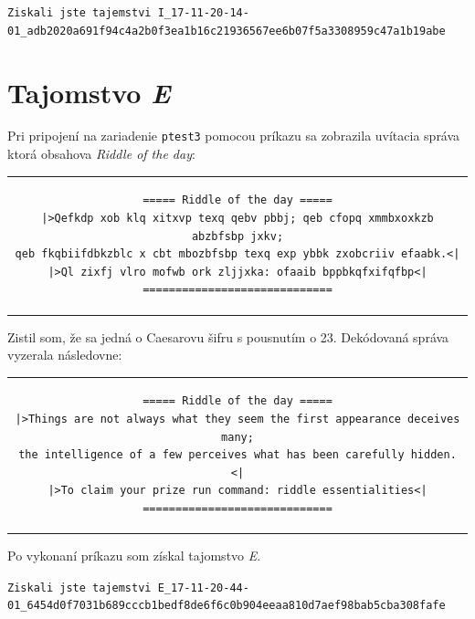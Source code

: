 \documentclass[11pt,a4paper]{article}
\begin{document}
\begin{center}
\small{\texttt{Ziskali jste tajemstvi I\_17-11-20-14-01\_adb2020a691f94c4a2b0f3ea1b16c21936567ee6b07f5a3308959c47a1b19abe}}
\end{center}

\section{Tajomstvo \textit{E}}\label{sec:E}

Pri pripojení na zariadenie \texttt{ptest3} pomocou príkazu  sa zobrazila uvítacia správa ktorá obsahova \textit{Riddle of the day}:

\begin{center}
\begin{tabular}{c}
\begin{lstlisting}[basicstyle=\footnotesize]
===== Riddle of the day =====
|>Qefkdp xob klq xitxvp texq qebv pbbj; qeb cfopq xmmbxoxkzb abzbfsbp jxkv;
qeb fkqbiifdbkzblc x cbt mbozbfsbp texq exp ybbk zxobcriiv efaabk.<|
|>Ql zixfj vlro mofwb ork zljjxka: ofaaib bppbkqfxifqfbp<|
=============================
\end{lstlisting}
\end{tabular}
\end{center}

Zistil som, že sa jedná o Caesarovu šifru s pousnutím o 23. Dekódovaná správa vyzerala následovne:

\begin{center}
\begin{tabular}{c}
\begin{lstlisting}[basicstyle=\footnotesize]
===== Riddle of the day =====
|>Things are not always what they seem the first appearance deceives many;
the intelligence of a few perceives what has been carefully hidden.<|
|>To claim your prize run command: riddle essentialities<|
=============================
\end{lstlisting}
\end{tabular}
\end{center}

Po vykonaní príkazu  som získal tajomstvo \textit{E}.

\begin{center}
\small{\texttt{Ziskali jste tajemstvi E\_17-11-20-44-01\_6454d0f7031b689cccb1bedf8de6f6c0b904eeaa810d7aef98bab5cba308fafe}}
\end{center}
\end{document}
